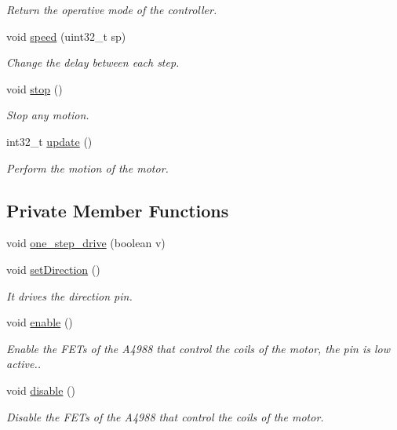\begin{DoxyCompactItemize}
\begin{DoxyCompactList}\small\item\em Return the operative mode of the controller. \end{DoxyCompactList}\item 
void \hyperlink{class_m_s_m_c___a4988_a6f9d236dc619342d16457aa029faeed9}{speed} (uint32\+\_\+t sp)
\begin{DoxyCompactList}\small\item\em Change the delay between each step. \end{DoxyCompactList}\item 
void \hyperlink{class_m_s_m_c___a4988_a4038481ce6b8131ea22d5e0d331ca6c7}{stop} ()
\begin{DoxyCompactList}\small\item\em Stop any motion. \end{DoxyCompactList}\item 
int32\+\_\+t \hyperlink{class_m_s_m_c___a4988_a1f408597bc1daf8bb5e563d54bf32cdd}{update} ()
\begin{DoxyCompactList}\small\item\em Perform the motion of the motor. \end{DoxyCompactList}\end{DoxyCompactItemize}
\subsection*{Private Member Functions}
\begin{DoxyCompactItemize}
\item 
void \hyperlink{class_m_s_m_c___a4988_ac177dd03f28d347cfa6212bc54394027}{one\+\_\+step\+\_\+drive} (boolean v)
\item 
void \hyperlink{class_m_s_m_c___a4988_ab9bd155f40ee777f17d1c4b1a702a60a}{set\+Direction} ()
\begin{DoxyCompactList}\small\item\em It drives the direction pin. \end{DoxyCompactList}\item 
void \hyperlink{class_m_s_m_c___a4988_a1157e26b461a3689558cd205880ef3b9}{enable} ()
\begin{DoxyCompactList}\small\item\em Enable the F\+E\+Ts of the A4988 that control the coils of the motor, the pin is low active.. \end{DoxyCompactList}\item 
void \hyperlink{class_m_s_m_c___a4988_a525c9313ee313d9c6316fc743b7b4ae0}{disable} ()
\begin{DoxyCompactList}\small\item\em Disable the F\+E\+Ts of the A4988 that control the coils of the motor. \end{DoxyCompactList}\end{DoxyCompactItemize}
